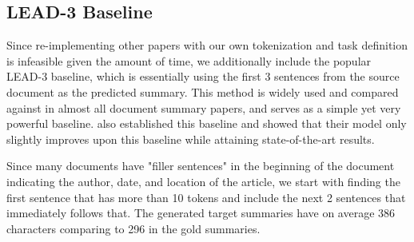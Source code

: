 \documentclass[11pt,a4paper]{article}
\begin{document}
\subsection{LEAD-3 Baseline}
Since re-implementing other papers with our own tokenization and task definition is infeasible given the amount of time, we additionally include the popular LEAD-3 baseline, which is essentially using the first 3 sentences from the source document as the predicted summary. This method is widely used and compared against in almost all document summary papers, and serves as a simple yet very powerful baseline. \citet{bottom-up} also established this baseline and showed that their model only slightly improves upon this baseline while attaining state-of-the-art results.

Since many documents have "filler sentences" in the beginning of the document indicating the author, date, and location of the article, we start with finding the first sentence that has more than 10 tokens and include the next 2 sentences that immediately follows that. The generated target summaries have on average 386 characters comparing to 296 in the gold summaries.
\end{document}
